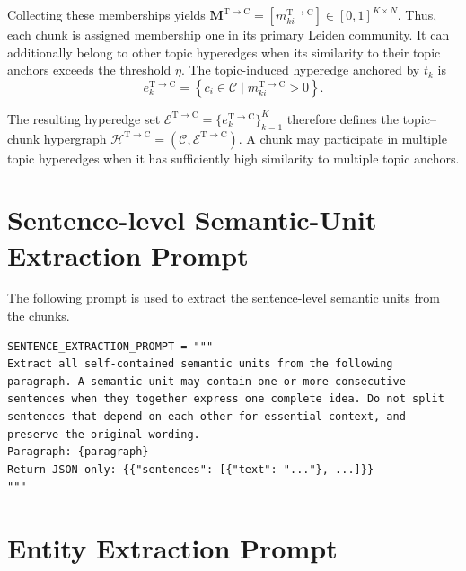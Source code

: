 \documentclass{article} %
\begin{document}
Collecting these memberships yields
$\mathbf{M}^{\mathrm{T}\to\mathrm{C}}
=[m_{ki}^{\mathrm{T}\to\mathrm{C}}]\in[0,1]^{K\times N}$.
Thus, each chunk is assigned membership one in its primary Leiden community.
It can additionally belong to other topic hyperedges when its similarity to
their topic anchors exceeds the threshold $\eta$. The topic-induced hyperedge
anchored by $t_k$ is
\begin{equation}
e_k^{\mathrm{T}\to\mathrm{C}}
=\left\{c_i\in\mathcal{C}\mid
m_{ki}^{\mathrm{T}\to\mathrm{C}}>0\right\}.
\end{equation}

The resulting hyperedge set
$\mathcal{E}^{\mathrm{T}\to\mathrm{C}}
=\{e_k^{\mathrm{T}\to\mathrm{C}}\}_{k=1}^{K}$ therefore defines the
topic--chunk hypergraph
$\mathcal{H}^{\mathrm{T}\to\mathrm{C}}
=(\mathcal{C},\mathcal{E}^{\mathrm{T}\to\mathrm{C}})$.
A chunk may participate in multiple topic hyperedges when it has
sufficiently high similarity to multiple topic anchors.

\section{Sentence-level Semantic-Unit Extraction Prompt}
\label{app:sentence_extraction_prompt}

The following prompt is used to extract the sentence-level semantic units from the chunks.
\begin{lstlisting}
SENTENCE_EXTRACTION_PROMPT = """
Extract all self-contained semantic units from the following paragraph. A semantic unit may contain one or more consecutive sentences when they together express one complete idea. Do not split sentences that depend on each other for essential context, and preserve the original wording.
Paragraph: {paragraph}
Return JSON only: {{"sentences": [{"text": "..."}, ...]}}
"""
\end{lstlisting}

\section{Entity Extraction Prompt}
\label{app:entity_extraction_prompt}
\end{document}
